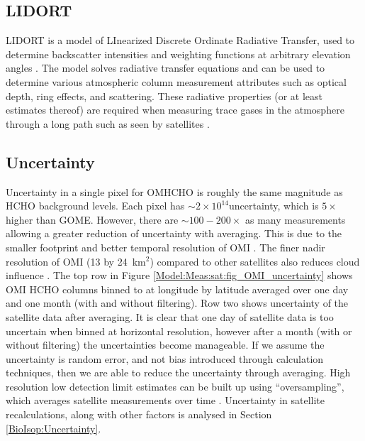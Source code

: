   \subsection{LIDORT}
    \label{Model:Meas:sat:LIDORT}
    
    LIDORT is a model of LInearized Discrete Ordinate Radiative Transfer, used to determine backscatter intensities and weighting functions at arbitrary elevation angles \parencite{Spurr2001}.
    The model solves radiative transfer equations and can be used to determine various atmospheric column measurement attributes such as optical depth, ring effects, and scattering.
    These radiative properties (or at least estimates thereof) are required when measuring trace gases in the atmosphere through a long path such as seen by satellites \parencite[e.g.,][]{Palmer2001,Martin2002a,DeSmedt2015,Abad2015}.
  
  \subsection{Uncertainty}
    Uncertainty in a single pixel for OMHCHO is roughly the same magnitude as HCHO background levels.
    Each pixel has $\sim 2 \times 10^{14}$\moleccm uncertainty, which is $5 \times$ higher than GOME.
    However, there are $\sim 100-200 \times $ as many measurements allowing a greater reduction of uncertainty with averaging.
    This is due to the smaller footprint and better temporal resolution of OMI \parencite{Chance2002,Millet2008}.
    The finer nadir resolution of OMI (13 by 24~km${^2}$) compared to other satellites also reduces cloud influence \parencite{Millet2006, Millet2008}.
    The top row in Figure \ref{Model:Meas:sat:fig_OMI_uncertainty} shows OMI HCHO columns binned to at \highhr longitude by latitude averaged over one day and one month (with and without filtering).
    Row two shows uncertainty of the satellite data after averaging.
    It is clear that one day of satellite data is too uncertain when binned at \highhr horizontal resolution, however after a month (with or without filtering) the uncertainties become manageable.
    If we assume the uncertainty is random error, and not bias introduced through calculation techniques, then we are able to reduce the uncertainty through averaging.
    High resolution low detection limit estimates can be built up using ``oversampling'', which averages satellite measurements over time \parencite[e.g.,][]{Zhu2014}.
    Uncertainty in satellite recalculations, along with other factors is analysed in Section \ref{BioIsop:Uncertainty}.
    

